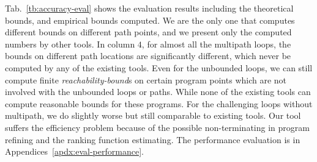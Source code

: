 Tab.~\ref{tb:accuracy-eval} shows the evaluation results including the theoretical bounds, and empirical bounds computed.
We are the only one that computes different bounds on different path points,
and we present only the computed numbers by other tools. In column $4$, for almost all the multipath loops, the bounds on different path locations are significantly different, which never be computed by any of the existing tools.
Even for the unbounded loops, we can still compute finite \emph{reachability-bound}s on certain program points which are not involved with the unbounded loops or paths.
While none of the existing tools can compute reasonable bounds for these programs.
For the challenging loops without multipath, we do slightly worse but still comparable to existing tools.
Our tool suffers the efficiency problem because of the possible non-terminating in program refining and the ranking function estimating.
The performance evaluation is in Appendices~\ref{apdx:eval-performance}.
